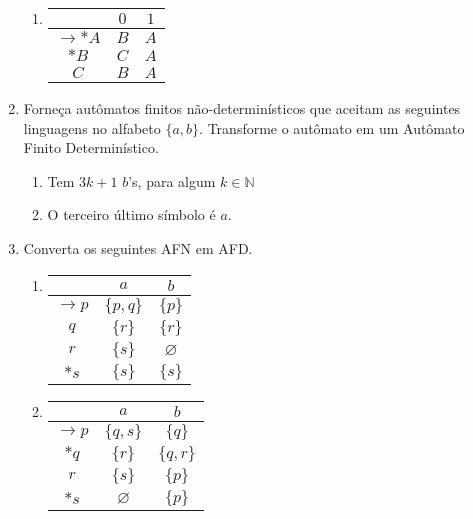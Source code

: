 \documentclass[12pt]{article}
\def\emptyset{\varnothing}
\begin{document}
\begin{enumerate}
\begin{enumerate}
\item 
\begin{tabular}{c||c|c}
                 & $0$ & $1$  \\\hline\hline
$\rightarrow *A$ & $B$ & $A$ \\
$            *B$ & $C$ & $A$ \\
$             C$ & $B$ & $A$ 
\end{tabular}

\end{enumerate} 




\break





\item Forneça autômatos finitos não-determinísticos que aceitam as seguintes linguagens no alfabeto $\{a, b\}$.
Transforme o autômato em um Autômato Finito Determinístico.

\begin{enumerate}

\item Tem $3k+1$ $b$'s, para algum $k\in\mathbb{N}$

\item O terceiro último símbolo é $a$.

\end{enumerate}


\item Converta os seguintes AFN em AFD.

\begin{enumerate}

\item
\begin{tabular}{c||c|c}
                &    $a$    &     $b$     \\\hline\hline
$\rightarrow p$ & $\{p,q\}$ &   $\{p\}$   \\
$            q$ &  $\{r\}$  &   $\{r\}$   \\
$            r$ &  $\{s\}$  & $\emptyset$ \\
$           *s$ &  $\{s\}$  &   $\{s\}$
\end{tabular}

\item
\begin{tabular}{c||c|c}
                &    $a$    &     $b$   \\\hline\hline
$\rightarrow p$ & $\{q,s\}$ &  $\{q\}$  \\
$           *q$ &  $\{r\}$  & $\{q,r\}$ \\
$            r$ &  $\{s\}$  &  $\{p\}$  \\
$           *s$ &$\emptyset$&  $\{p\}$
\end{tabular}

\end{enumerate}







\end{enumerate}
\end{document}
